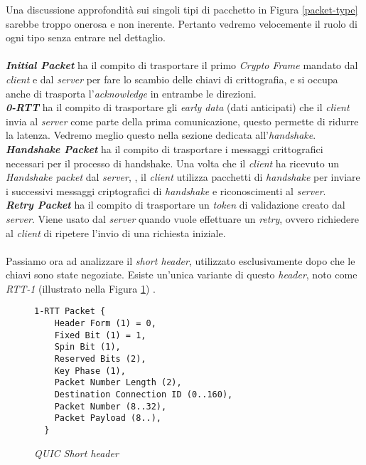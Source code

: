 \noindent Una discussione approfondità sui singoli tipi di pacchetto in Figura \ref{packet-type} sarebbe troppo onerosa e non inerente. Pertanto vedremo velocemente il ruolo di ogni tipo senza entrare nel dettaglio. 
\\\\
\indent \textbf{\emph{Initial Packet}} ha il compito di trasportare il primo \emph{Crypto Frame} mandato dal \emph{client} e dal \emph{server} per fare lo scambio delle chiavi di crittografia, e si occupa anche di trasporta l'\emph{acknowledge} in entrambe le direzioni.
\\
\indent \textbf{\emph{0-RTT}}  ha il compito di trasportare gli \emph{early data} (dati anticipati) che il \emph{client} invia al \emph{server} come parte della prima comunicazione, questo permette di ridurre la latenza. Vedremo meglio questo nella sezione dedicata all'\emph{handshake}.
\\
\indent \textbf{\emph{Handshake Packet}}  ha il compito di trasportare i messaggi crittografici necessari per il processo di handshake. Una volta che il \emph{client} ha ricevuto un \emph{Handshake packet} dal \emph{server}, , il \emph{client} utilizza pacchetti di \emph{handshake} per inviare i successivi messaggi criptografici di \emph{handshake} e riconoscimenti al \emph{server}.
\\
\indent \textbf{\emph{Retry Packet}}  ha il compito di trasportare un \emph{token} di validazione creato dal \emph{server}. Viene usato dal \emph{server} quando vuole effettuare un \emph{retry}, ovvero richiedere al \emph{client} di ripetere l'invio di una richiesta iniziale.
\\\\
Passiamo ora ad analizzare il \emph{short header}, utilizzato esclusivamente dopo che le chiavi sono state negoziate. Esiste un'unica variante di questo \emph{header}, noto come \emph{RTT-1} (illustrato nella Figura \ref{short-header}) \cite{site:rfc9000}.
\begin{figure}[!h]
    \centering
    \begin{small}
    \begin{BVerbatim}
1-RTT Packet {
    Header Form (1) = 0,
    Fixed Bit (1) = 1,
    Spin Bit (1),
    Reserved Bits (2),
    Key Phase (1),
    Packet Number Length (2),
    Destination Connection ID (0..160),
    Packet Number (8..32),
    Packet Payload (8..),
  }
    \end{BVerbatim}
\end{small}
    \caption{\emph{QUIC Short header}}
    \label{short-header}
\end{figure}
